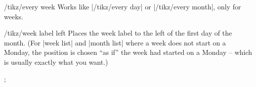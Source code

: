 \begin{stylekey}{/tikz/every week}
  Works like |/tikz/every day| or |/tikz/every month|, only for weeks.
\end{stylekey}

\begin{stylekey}{/tikz/week label left}
    Places the week label to the left of the first day of the month. (For
    |week list| and |month list| where a week does not start on a Monday, the
    position is chosen ``as if'' the week had started on a Monday --  which is
    usually exactly what you want.)
\begin{codeexample}[preamble={\usetikzlibrary{calendar-plus}}]
\tikz
  \calendar [week list, month label above centered,
             dates=2022-07-01 to 2022-07-31,
             week label left,
             every week/.append style={gray!50!black,font=\sffamily}];
\end{codeexample}
\end{stylekey}